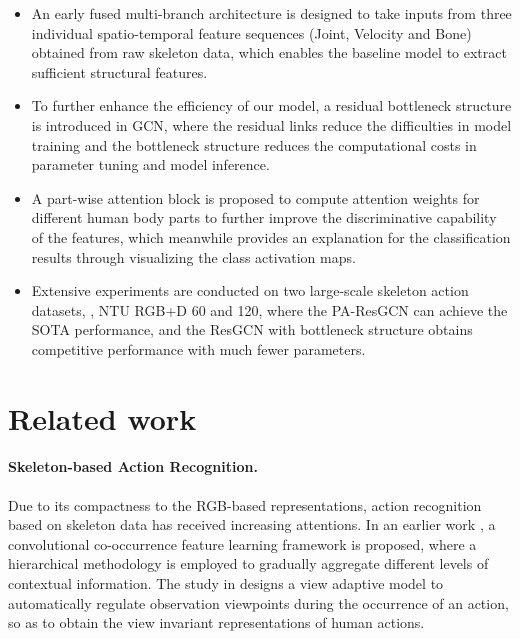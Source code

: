 \documentclass[sigconf]{acmart}
\begin{document}
\begin{itemize}
  \item	An early fused multi-branch architecture is designed to take inputs from three individual spatio-temporal feature sequences (Joint, Velocity and Bone) obtained from raw skeleton data, which enables the baseline model to extract sufficient structural features.
  \item To further enhance the efficiency of our model, a residual bottleneck structure is introduced in GCN, where the residual links reduce the difficulties in model training and the bottleneck structure reduces the computational costs in parameter tuning and model inference.
  \item A part-wise attention block is proposed to compute attention weights for different human body parts to further improve the discriminative capability of the features, which meanwhile provides an explanation for the classification results through visualizing the class activation maps.
  \item Extensive experiments are conducted on two large-scale skeleton action datasets, \ie, NTU RGB+D 60 and 120, where the PA-ResGCN can achieve the SOTA performance, and the ResGCN with bottleneck structure obtains competitive performance with much fewer parameters.
\end{itemize}

\section{Related work}
\label{sec:related}

\paragraph{Skeleton-based Action Recognition.} Due to its compactness to the RGB-based representations, action recognition based on skeleton data has received increasing attentions. In an earlier work \cite{li2018co}, a convolutional co-occurrence feature learning framework is proposed, where a hierarchical methodology is employed to gradually aggregate different levels of contextual information. The study in \cite{zhang2019view} designs a view adaptive model to automatically regulate observation viewpoints during the occurrence of an action, so as to obtain the view invariant representations of human actions.
\end{document}
